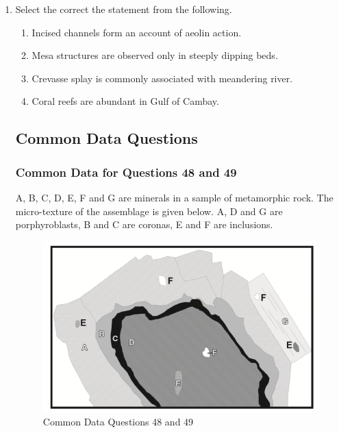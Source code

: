 \documentclass[journal,12pt,onecolumn]{IEEEtran}
\theoremstyle{remark}
\begin{document}
\begin{enumerate}
            \begin{enumerate}
            \end{enumerate}
        \item Select the correct the statement from the following. \hfill{}
            \begin{enumerate}
                \item Incised channels form an account of aeolin action.
                \item Mesa structures are observed only in steeply dipping beds.
                \item Crevasse splay is commonly associated with meandering river.
                \item Coral reefs are abundant in Gulf of Cambay.
            \end{enumerate}
            \newpage
\subsection*{Common Data Questions}
\subsubsection*{Common Data for Questions 48 and 49}

A, B, C, D, E, F and G are minerals in a sample of metamorphic rock. The micro-texture of the assemblage is given below. A, D and G are porphyroblasts, B and C are coronas, E and F are inclusions.

        \begin{figure}[h]
            \centering
            \includegraphics[width=1\columnwidth]{Figs/fig4.png}
            \caption{Common Data Questions 48 and 49}
            \label{fig:placeholder_4}
        \end{figure}


\end{enumerate}
\end{document}
